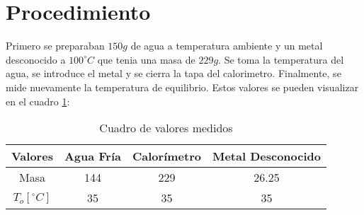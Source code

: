 \documentclass[12pt]{report}
\begin{document}
\section{Procedimiento}
Primero se preparaban $150 g$ de agua a temperatura ambiente y un metal desconocido a $100^\circ C$ que tenia una masa de $229 g$. Se toma la temperatura del agua, se introduce el metal y se cierra la tapa del calorimetro. Finalmente, se mide nuevamente la temperatura de equilibrio.
Estos valores se pueden visualizar en el cuadro \ref{table:data}:

\begin{table}[h!]
\centering
\begin{tabular}{||c c c c||}
    \hline
    Valores & Agua Fría & Calorímetro & Metal Desconocido \\ [0.5ex]
    \hline\hline
    Masa & 144 & 229 & 26.25 \\
    $T_o [^\circ C]$ & 35 & 35 & 35 \\
    \hline
\end{tabular}
\caption{Cuadro de valores medidos}
\label{table:data}
\end{table}
\end{document}
